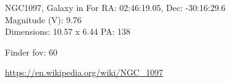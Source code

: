 \begin{block}{NGC1097, Galaxy in For}
    RA: 02:46:19.05, Dec: -30:16:29.6 \\ 
    Magnitude (V): 9.76 \\ 
    Dimensions: 10.57 x 6.44 PA: 138 

    Finder fov: 60 

    \url{https://en.wikipedia.org/wiki/NGC_1097} 
\end{block}